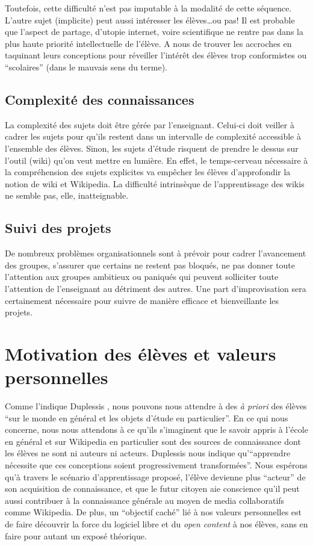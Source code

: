 \documentclass[11pt,bibliography=totoc]{scrartcl}
\begin{document}
Toutefois, cette difficulté n'est pas imputable à la modalité de cette séquence.
L'autre sujet (implicite) peut aussi intéresser les élèves\ldots ou pas! Il est
probable que l'aspect de partage, d'utopie internet, voire scientifique ne
rentre pas dans la plus haute priorité intellectuelle de l'élève. A nous de
trouver les accroches en taquinant leurs conceptions pour réveiller l'intérêt
des élèves trop conformistes ou ``scolaires'' (dans le mauvais sens du terme).

\subsection{Complexité des connaissances}
La complexité des sujets doit être gérée par l'enseignant. Celui-ci doit veiller
à cadrer les sujets pour qu'ils restent dans un intervalle de complexité
accessible à l'ensemble des élèves. Sinon, les sujets d'étude risquent de
prendre le dessus sur l'outil (wiki) qu'on veut mettre en lumière. En effet, le
temps-cerveau nécessaire à la compréhension des sujets explicites va empêcher
les élèves d'approfondir la notion de wiki et Wikipedia.  La difficulté
intrinsèque de l'apprentissage des wikis ne semble pas, elle, inatteignable.

\subsection{Suivi des projets}
De nombreux problèmes organisationnels sont à prévoir pour cadrer l'avancement
des groupes, s'assurer que certains ne restent pas bloqués, ne pas donner toute
l'attention aux groupes ambitieux ou paniqués qui peuvent solliciter toute
l'attention de l'enseignant au détriment des autres.  Une part d'improvisation
sera certainement nécessaire pour suivre de manière efficace et bienveillante
les projets.

\section{Motivation des élèves et valeurs personnelles}
Comme l'indique Duplessis \cite{duplessis}, nous pouvons nous attendre à des
\textit{à priori} des élèves ``sur le monde en général et les objets d'étude en
particulier''. En ce qui nous concerne, nous nous attendons à ce qu'ils
s'imaginent que le savoir appris à l'école en général et sur Wikipedia en
particulier sont des sources de connaissance dont les élèves ne sont ni auteurs ni
acteurs. Duplessis nous indique qu'``apprendre nécessite que ces conceptions
soient progressivement transformées''. Nous espérons qu'à travers le scénario
d'apprentissage proposé, l'élève devienne plus ``acteur'' de son acquisition de
connaissance, et que le futur citoyen aie conscience qu'il peut aussi contribuer
à la connaissance générale au moyen de media collaboratifs comme Wikipedia.
De plus, un ``objectif caché'' lié à nos valeurs personnelles est de faire
découvrir la force du logiciel libre et du \textit{open content} à nos élèves,
sans en faire pour autant un exposé théorique.
 
\end{document}
